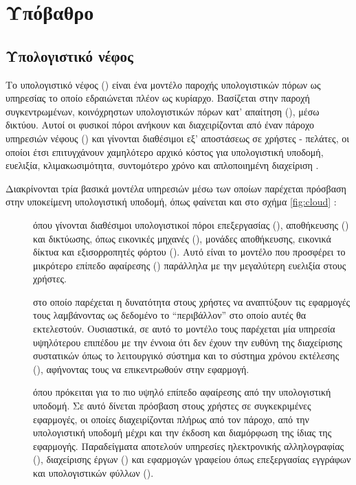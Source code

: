 \chapter{Υπόβαθρο}

\section{Υπολογιστικό νέφος}
Το υπολογιστικό νέφος () είναι ένα μοντέλο παροχής
υπολογιστικών πόρων ως υπηρεσίας το οποίο εδραιώνεται πλέον ως κυρίαρχο.
Βασίζεται στην παροχή συγκεντρωμένων, κοινόχρηστων υπολογιστικών πόρων κατ'
απαίτηση (), μέσω δικτύου. Αυτοί οι φυσικοί πόροι
ανήκουν και διαχειρίζονται από έναν πάροχο υπηρεσιών νέφους () και γίνονται διαθέσιμοι εξ' αποστάσεως σε χρήστες - πελάτες, οι
οποίοι έτσι επιτυγχάνουν χαμηλότερο αρχικό κόστος για υπολογιστική υποδομή,
ευελιξία, κλιμακωσιμότητα, συντομότερο χρόνο  και απλοποιημένη
διαχείριση \cite{wiki:cloud}.

Διακρίνονται τρία βασικά μοντέλα υπηρεσιών  μέσω των οποίων παρέχεται
πρόσβαση στην υποκείμενη υπολογιστική υποδομή, όπως φαίνεται και στο σχήμα
\ref{fig:cloud} \cite{nist-cloud}:
\begin{description}
    \item[] όπου γίνονται διαθέσιμοι
        υπολογιστικοί πόροι επεξεργασίας (), αποθήκευσης
        () και δικτύωσης, όπως εικονικές μηχανές (), μονάδες αποθήκευσης, εικονικά δίκτυα και εξισορροπητές
        φόρτου (). Αυτό είναι το μοντέλο που προσφέρει το
        μικρότερο επίπεδο αφαίρεσης () παράλληλα με την
        μεγαλύτερη ευελιξία στους χρήστες.
    \item[] στο οποίο παρέχεται η δυνατότητα
        στους χρήστες να αναπτύξουν τις εφαρμογές τους λαμβάνοντας ως δεδομένο
        το ``περιβάλλον'' στο οποίο αυτές θα εκτελεστούν. Ουσιαστικά, σε αυτό το
        μοντέλο τους παρέχεται μία υπηρεσία υψηλότερου επιπέδου με την έννοια
        ότι δεν έχουν την ευθύνη της διαχείρισης συστατικών όπως το λειτουργικό
        σύστημα και το σύστημα χρόνου εκτέλεσης (), αφήνοντας
        τους να επικεντρωθούν στην εφαρμογή.
    \item[] όπου πρόκειται για το πιο υψηλό
        επίπεδο αφαίρεσης από την υπολογιστική υποδομή. Σε αυτό δίνεται
        πρόσβαση στους χρήστες σε συγκεκριμένες εφαρμογές, οι οποίες
        διαχειρίζονται πλήρως από τον πάροχο, από την υπολογιστική υποδομή μέχρι
        και την έκδοση και διαμόρφωση της ίδιας της εφαρμογής. Παραδείγματα
        αποτελούν υπηρεσίες ηλεκτρονικής αλληλογραφίας (), διαχείρισης
        έργων () και εφαρμογών γραφείου όπως επεξεργασίας
        εγγράφων και υπολογιστικών φύλλων ().
\end{description}

